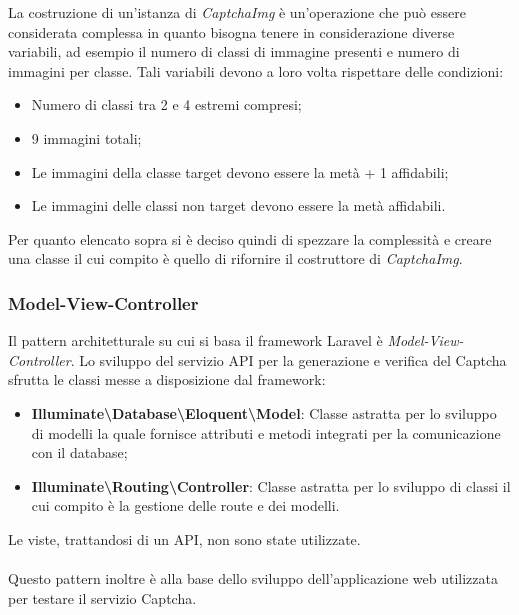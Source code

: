 La costruzione di un'istanza di \textit{CaptchaImg} è un'operazione che può essere considerata complessa in quanto bisogna tenere in considerazione diverse variabili, ad esempio il numero di classi di immagine presenti e numero di immagini per classe.
Tali variabili devono a loro volta rispettare delle condizioni:
\begin{itemize}
    \item Numero di classi tra 2 e 4 estremi compresi;
    \item 9 immagini totali;
    \item Le immagini della classe target devono essere la metà + 1 affidabili;
    \item Le immagini delle classi non target devono essere la metà affidabili.
\end{itemize}
Per quanto elencato sopra si è deciso quindi di spezzare la complessità e creare una classe il cui compito è quello di rifornire il costruttore di \textit{CaptchaImg}. 

\subsubsection{Model-View-Controller}
Il pattern architetturale su cui si basa il framework Laravel è \textit{Model-View-Controller}.
Lo sviluppo del servizio API per la generazione e verifica del Captcha sfrutta le classi messe a disposizione dal framework:
\begin{itemize}
    \item \textbf{Illuminate\textbackslash Database\textbackslash Eloquent\textbackslash Model}: Classe astratta per lo sviluppo di modelli la quale fornisce attributi e metodi integrati per la comunicazione con il database;
    \item \textbf{Illuminate\textbackslash Routing\textbackslash Controller}: Classe astratta per lo sviluppo di classi il cui compito è la gestione delle route e dei modelli.
\end{itemize}
Le viste, trattandosi di un API, non sono state utilizzate.
\\\\
Questo pattern inoltre è alla base dello sviluppo dell'applicazione web utilizzata per testare il servizio Captcha.